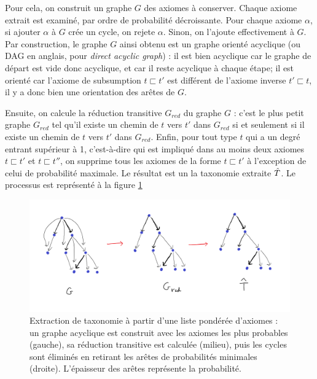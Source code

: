 Pour cela, on construit un graphe $G$ des axiomes à conserver. Chaque axiome extrait est examiné, par ordre de probabilité décroissante. Pour chaque axiome $\alpha$, si ajouter $\alpha$ à $G$ crée un cycle, on rejete $\alpha$. Sinon, on l'ajoute effectivement à $G$. Par construction, le graphe $G$ ainsi obtenu est un graphe orienté acyclique (ou DAG en anglais, pour \textit{direct acyclic graph}) : il est bien acyclique car le graphe de départ est vide donc acyclique, et car il reste acyclique à chaque étape; il est orienté car l'axiome de subsumption $t \sqsubset t'$ est différent de l'axiome inverse $t' \sqsubset t$, il y a donc bien une orientation des arêtes de $G$. 

Ensuite, on calcule la réduction transitive $G_{red}$ du graphe $G$ : c'est le plus petit graphe $G_{red}$ tel qu'il existe un chemin de $t$ vers $t'$ dans $G_{red}$ si et seulement si il existe un chemin de $t$ vers $t'$ dans $G_{red}$. Enfin, pour tout type $t$ qui a un degré entrant supérieur à 1, c'est-à-dire qui est impliqué dans au moins deux axiomes $t \sqsubset t'$ et $t\sqsubset t''$, on supprime tous les axiomes de la forme $t \sqsubset t'$ à l'exception de celui de probabilité maximale. Le résultat est un la taxonomie extraite $\hat{T}$. Le processus est représenté à la figure \ref{fig:softmapping-extraction}

\begin{figure}
    \centering
    \includegraphics[width=\textwidth]{img/softmapping_extraction.png}
    \caption[Extraction de taxonomie à partir d'un graphe acyclique]{Extraction de taxonomie à partir d'une liste pondérée d'axiomes : un graphe acyclique est construit avec les axiomes les plus probables (gauche), sa réduction transitive est calculée (milieu), puis les cycles sont éliminés en retirant les arêtes de probabilités minimales (droite). L'épaisseur des arêtes représente la probabilité.}
    \label{fig:softmapping-extraction}
\end{figure}

